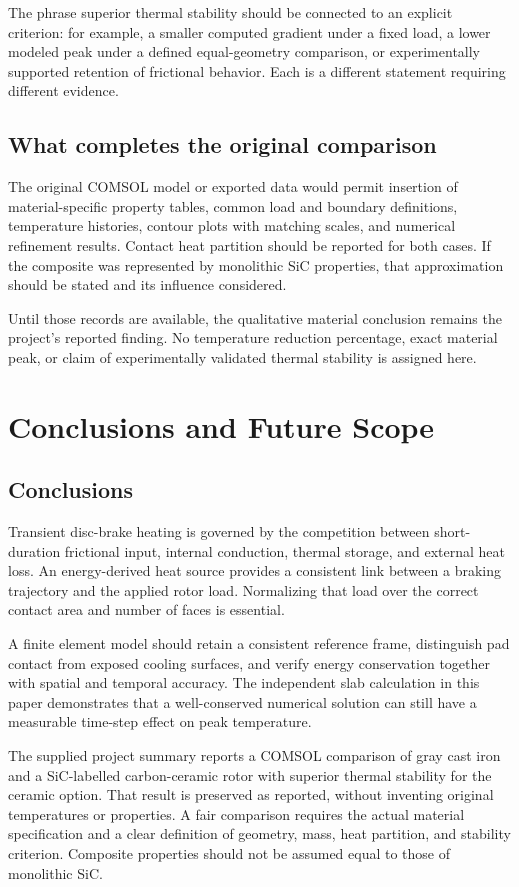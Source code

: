 \documentclass[11pt,a4paper]{article}
\newcommand{\sectionpage}[1]{\clearpage\section{#1}}
\begin{document}
The phrase superior thermal stability should be connected to an explicit criterion: for example, a smaller computed gradient under a fixed load, a lower modeled peak under a defined equal-geometry comparison, or experimentally supported retention of frictional behavior. Each is a different statement requiring different evidence.

\subsection{What completes the original comparison}
The original COMSOL model or exported data would permit insertion of material-specific property tables, common load and boundary definitions, temperature histories, contour plots with matching scales, and numerical refinement results. Contact heat partition should be reported for both cases. If the composite was represented by monolithic SiC properties, that approximation should be stated and its influence considered.

Until those records are available, the qualitative material conclusion remains the project's reported finding. No temperature reduction percentage, exact material peak, or claim of experimentally validated thermal stability is assigned here.

\sectionpage{Conclusions and Future Scope}
\subsection{Conclusions}
Transient disc-brake heating is governed by the competition between short-duration frictional input, internal conduction, thermal storage, and external heat loss. An energy-derived heat source provides a consistent link between a braking trajectory and the applied rotor load. Normalizing that load over the correct contact area and number of faces is essential.

A finite element model should retain a consistent reference frame, distinguish pad contact from exposed cooling surfaces, and verify energy conservation together with spatial and temporal accuracy. The independent slab calculation in this paper demonstrates that a well-conserved numerical solution can still have a measurable time-step effect on peak temperature.

The supplied project summary reports a COMSOL comparison of gray cast iron and a SiC-labelled carbon-ceramic rotor with superior thermal stability for the ceramic option. That result is preserved as reported, without inventing original temperatures or properties. A fair comparison requires the actual material specification and a clear definition of geometry, mass, heat partition, and stability criterion. Composite properties should not be assumed equal to those of monolithic SiC.
\end{document}
